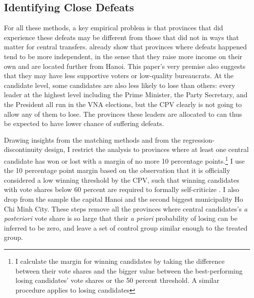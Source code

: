 \documentclass[12pt]{article}
\newcommand{\1}{\mathbbm{1}}
\begin{document}
\subsection{Identifying Close Defeats}
\label{sec:methods_sample}

For all these methods, a key empirical problem is that provinces that did experience these defeats may be different from those that did not in ways that matter for central transfers. \citet{MaleskySchuler2011} already show that provinces where defeats happened tend to be more independent, in the sense that they raise more income on their own and are located further from Hanoi. This paper's very premise also suggests that they may have less supportive voters or low-quality bureaucrats. At the candidate level, some candidates are also less likely to lose than others: every leader at the highest level  including the Prime Minister, the Party Secretary, and the President all run in the VNA elections, but the CPV clearly is not going to allow any of them to lose. The provinces these leaders are allocated to can thus be expected to have lower chance of suffering defeats. 

Drawing insights from the matching methods and from the regression-discontinuity design, I restrict the analysis to provinces where at least one central candidate has won or lost with a margin of no more 10 percentage points.\footnote{I calculate the margin for winning candidates by taking the difference between their vote shares and the bigger value between the best-performing losing candidates' vote shares or the 50 percent threshold. A similar procedure applies to losing candidates} I use the 10 percentage point margin based on the observation that it is officially considered a low winning threshold by the CPV, such that winning candidates with vote shares below 60 percent are required to formally self-criticize \citep{MaleskySchuler2011}. I also drop from the sample the capital Hanoi and the second biggest municipality Ho Chi Minh City. These steps remove all the provinces where central candidates's \textit{a posteriori} vote share is so large that their \textit{a priori} probability of losing can be inferred to be zero, and leave a set of control group similar enough to the treated group.
\end{document}
